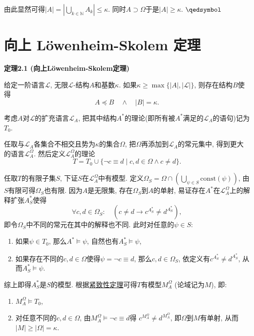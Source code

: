\documentclass[UTF8]{ctexart}
\begin{document}
\vspace{6pt}
由此显然可得$\displaystyle|A|=\left|\bigcup_{k\in\mathbb{N}}A_k\right|
\leqslant\kappa$. 同时$A\supset\Omega$于是$|A|\geqslant\kappa$. \hfill $\qedsymbol$





\newpage

\section{向上 Löwenheim-Skolem 定理}

\hypertarget{sec:定理2.1}{}
\noindent\textbf{定理2.1 (向上Löwenheim-Skolem定理)}

给定一阶语言$\mathcal{L}$, 无限$\mathcal{L}$-结构$A$和基数$\kappa$.
如果$\kappa\geqslant\max\{|A|,|\mathcal{L}|\}$, 则存在结构$B$使得
\[
    A\preccurlyeq B\quad\land\quad|B|=\kappa.
\]


考虑$A$对$\mathcal{L}$的扩充语言$\mathcal{L}_A$,
把其中结构$A^*$的理论(即所有被$A^*$满足的$\mathcal{L}_A$的语句)记为$T_0$.

任取与$\mathcal{L}_A$各集合不相交且势为$\kappa$的集合$\Omega$,
把$\Omega$再添加到$\mathcal{L}_A$的常元集中, 得到更大的语言$\mathcal{L}_A^\Omega$.
然后定义$\mathcal{L}_A^\Omega$的理论
\[
    T=T_0\cup\{\neg c\equiv d\mid c,d\in\Omega\land c\neq d\}.
\]

任取$T$的有限子集$S$, 下证$S$在$\mathcal{L}_A^\Omega$中有模型. 定义$\displaystyle
\Omega_S=\Omega\cap\left(\bigcup_{\psi\in S}\mathrm{const}(\psi)\right)$,
由$S$有限可得$\Omega_S$也有限. 因为$A$是无限集, 存在$\Omega_S$到$A$的单射,
易证存在$A^*$在$\mathcal{L}_A^\Omega$上的解释扩张$A^*_S$使得
\[
    \forall c,d\in\Omega_S:\quad(c\neq d\to c^{A^*_S}\neq d^{A^*_S}),
\]
即令$\Omega_S$中不同的常元在其中的解释也不同. 此时对任意的$\psi\in S$:
\begin{enumerate}
    \item 如果$\psi\in T_0$, 那么$A^*\models\psi$, 自然也有$A^*_S\models\psi$,
    \item 如果存在不同的$c,d\in\Omega$使得$\psi=\neg c\equiv d$,
    那么$c,d\in\Omega_S$, 依定义有$c^{A^*_S}\neq d^{A^*_S}$,
    从而$A^*_S\models\psi$.
\end{enumerate}
综上即得$A^*_S$是$S$的模型.
根据\href{../03 一阶紧致性定理/03 一阶紧致性定理#nameddest=sec:定理1.1}
{紧致性定理}可得$T$有模型$M_A^\Omega$ (论域记为$M$), 即:
\begin{enumerate}
    \item $M_A^\Omega\models T_0$,
    \item 对任意不同的$c,d\in\Omega$, 由$M_A^\Omega\models\neg c\equiv d$得
    $c^{M_A^\Omega}\neq d^{M_A^\Omega}$, 即$\Omega$到$M$有单射,
    从而$|M|\geqslant|\Omega|=\kappa$.
\end{enumerate}
\end{document}
